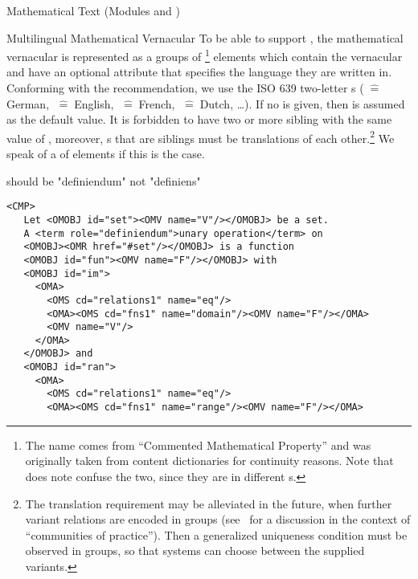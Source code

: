\begin{tchapter}[id=mtxt,short=Mathematical Text]{Mathematical Text (Modules
  {} and {})}
\begin{tsection}[id=mtext]{Multilingual Mathematical Vernacular}
To be able to support
{},
the mathematical vernacular is represented as a groups of {}\footnote{The name
  comes from ``Commented Mathematical Property'' and was originally taken from {\openmath}
  content dictionaries for continuity reasons. Note that {\xml}
  does note confuse the two, since they are in different {s}.}
elements which contain the vernacular and have an optional
{} attribute that specifies the language they are
written in. Conforming with the {\xml} recommendation, we use the ISO
639 two-letter {s}
({}$\;\widehat=\;$German, {}$\;\widehat=\;$English,
{}$\;\widehat=\;$French, {}$\;\widehat=\;$Dutch, \ldots). If
no {} is given, then {} is
assumed as the default value. It is forbidden to have two or more sibling {}
with the same value of {}, moreover, {}s
that are siblings must be translations of each other.\footnote{The translation requirement
  may be alleviated in the future, when further variant relations are encoded in
  {} groups (see~\cite{KohKoh:copmem06} for a discussion in the context of
  ``communities of practice''). Then a generalized uniqueness condition must be observed in
  {} groups, so that systems can choose between the supplied variants.} We
speak of a {} of {} elements if this is the
case.
\begin{erratum}[reported-by=Krzysztof Retel,date=2006-09-14]{should be "definiendum" not "definiens"}
\begin{lstlisting}[escapechar=\%,label=lst:multiling,mathescape,
  caption={A Multilingual Group of {\element{CMP}} Elements},
  index={trl,xml:lang,CMP,FMP,OMOBJ}]
 <CMP>
   Let <OMOBJ id="set"><OMV name="V"/></OMOBJ> be a set. 
   A <term role="definiendum">unary operation</term> on 
   <OMOBJ><OMR href="#set"/></OMOBJ> is a function  
   <OMOBJ id="fun"><OMV name="F"/></OMOBJ> with
   <OMOBJ id="im">
     <OMA>
       <OMS cd="relations1" name="eq"/>
       <OMA><OMS cd="fns1" name="domain"/><OMV name="F"/></OMA>
       <OMV name="V"/>
     </OMA>
   </OMOBJ> and 
   <OMOBJ id="ran">
     <OMA>
       <OMS cd="relations1" name="eq"/>
       <OMA><OMS cd="fns1" name="range"/><OMV name="F"/></OMA>

\end{lstlisting}
\end{erratum}
\end{tsection}
\end{tchapter}

